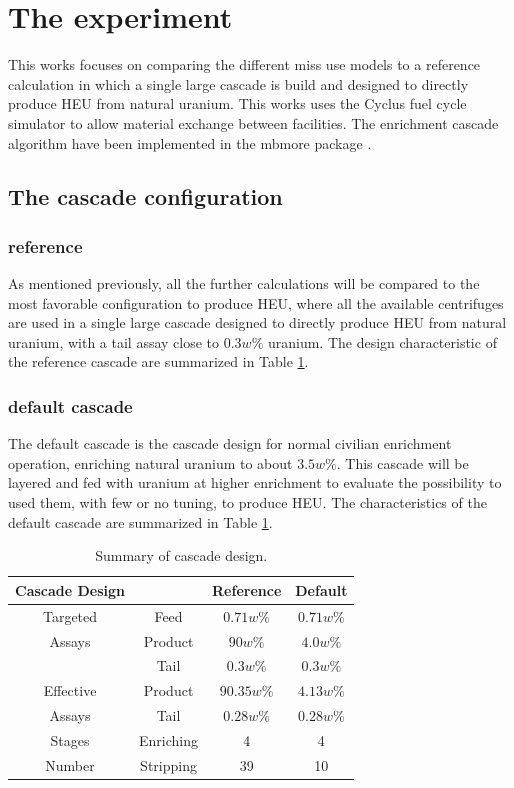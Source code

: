 \section{The experiment}
This works focuses on comparing the different miss use models to a reference
calculation in which a single large cascade is build and designed to directly
produce \gls{HEU} from natural uranium.
This works uses the Cyclus fuel cycle simulator to allow material exchange
between facilities. The enrichment cascade algorithm have been implemented in
the mbmore package \cite{mbmore.2018}.

\subsection{The cascade configuration}
\subsubsection{reference}
As mentioned previously, all the further calculations will be compared to the
most favorable configuration to produce \gls{HEU}, where all the available
centrifuges are used in a single large cascade designed to directly produce \gls{HEU}
from natural uranium, with a tail assay close to $0.3w\%$ uranium. The design
characteristic of the reference cascade are summarized in Table
\ref{tab:cascade_config}.

\subsubsection{default cascade}
The default cascade is the cascade design for normal civilian enrichment
operation, enriching natural uranium to about $3.5w\%$. This cascade will be
layered and fed with uranium at higher enrichment to evaluate the possibility
to used them, with few or no tuning, to produce \gls{HEU}. The characteristics of
the default cascade are summarized in Table \ref{tab:cascade_config}.

\begin{table}[htb]
\centering
  \caption{Summary of cascade design.}
\begin{tabular}{cccc}
\toprule

Cascade Design &       & Reference  & Default    \\
\midrule
Targeted  & Feed       & $0.71w\%$  & $0.71w\%$  \\
Assays    & Product    & $90w\%$    & $4.0w\%$   \\
          & Tail       & $0.3w\%$   & $0.3w\%$   \\
\midrule
Effective & Product    & $90.35w\%$ & $4.13w\%$  \\
Assays    & Tail       & $0.28w\%$  & $0.28w\%$  \\ 
\midrule
Stages    & Enriching  & 4          & 4          \\
Number    & Stripping  & 39         & 10         \\
\bottomrule
\end{tabular}
  \label{tab:cascade_config}
\end{table}


